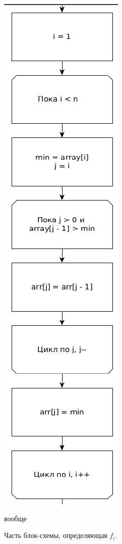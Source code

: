 \documentclass[12pt]{report}
\begin{document}
\begin{figure}
\begin{center}
\includegraphics[scale=0.5]{inc/img/insertionfi.png}
\captionsetup{justification=centering}
	\caption{Часть блок-схемы, определяющая $f_{i}$.}вообще
	\label{img:insertion:fi}	
\end{center}
\end{figure}
\newpage 
\end{document}

